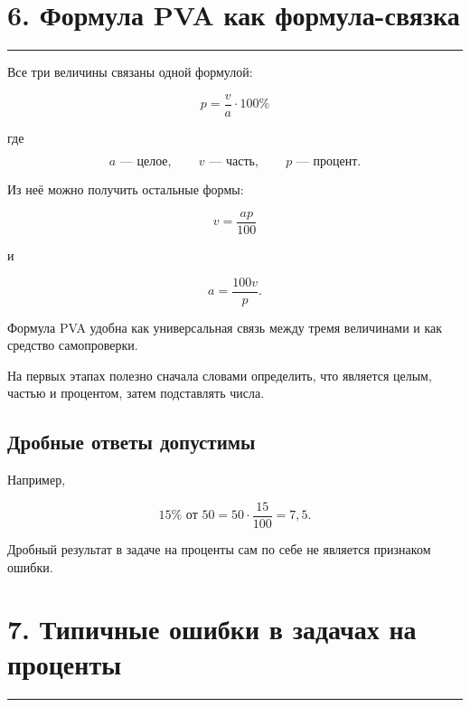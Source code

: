 \documentclass[a4paper,12pt]{article}
\newcommand{\sectionrule}{%
  \par
  \vspace{-0.35em}
  {\color{accent}\rule{\linewidth}{0.7pt}}
  \vspace{0.55em}
}
\begin{document}
\clearpage


\section*{6. Формула PVA как формула-связка}
\sectionrule

Все три величины связаны одной формулой:

\[
\boxed{
p=\frac{v}{a}\cdot100\%
}
\]

где

\[
a \text{ --- целое},
\qquad
v \text{ --- часть},
\qquad
p \text{ --- процент}.
\]

Из неё можно получить остальные формы:

\[
\boxed{
v=\frac{ap}{100}
}
\]

и

\[
\boxed{
a=\frac{100v}{p}
}.
\]

Формула PVA удобна как универсальная связь между тремя величинами
и как средство самопроверки.

На первых этапах полезно сначала словами определить,
что является целым, частью и процентом,
затем подставлять числа.

\subsection*{Дробные ответы допустимы}

Например,

\[
15\%\text{ от }50
=
50\cdot\frac{15}{100}
=
7{,}5.
\]

Дробный результат в задаче на проценты
сам по себе не является признаком ошибки.


\section*{7. Типичные ошибки в задачах на проценты}
\sectionrule
\end{document}
